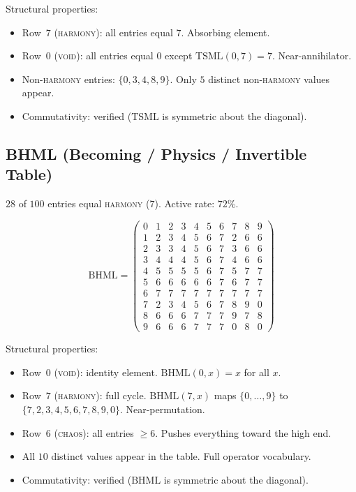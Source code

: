 \documentclass[11pt,a4paper]{article}
\theoremstyle{definition}
\theoremstyle{remark}
\newcommand{\TSML}{\mathrm{TSML}}
\newcommand{\BHML}{\mathrm{BHML}}
\begin{document}
Structural properties:
\begin{itemize}
\item Row~$7$ (\textsc{harmony}): all entries equal $7$. Absorbing element.
\item Row~$0$ (\textsc{void}): all entries equal $0$ except $\TSML(0,7)=7$. Near-annihilator.
\item Non-\textsc{harmony} entries: $\{0,3,4,8,9\}$. Only $5$ distinct non-\textsc{harmony} values appear.
\item Commutativity: verified ($\TSML$ is symmetric about the diagonal).
\end{itemize}

\subsection{BHML (Becoming / Physics / Invertible Table)}\label{app:bhml}

$28$ of $100$ entries equal \textsc{harmony} ($7$). Active rate: $72\%$.

\[
\BHML = \begin{pmatrix}
0 & 1 & 2 & 3 & 4 & 5 & 6 & 7 & 8 & 9\\
1 & 2 & 3 & 4 & 5 & 6 & 7 & 2 & 6 & 6\\
2 & 3 & 3 & 4 & 5 & 6 & 7 & 3 & 6 & 6\\
3 & 4 & 4 & 4 & 5 & 6 & 7 & 4 & 6 & 6\\
4 & 5 & 5 & 5 & 5 & 6 & 7 & 5 & 7 & 7\\
5 & 6 & 6 & 6 & 6 & 6 & 7 & 6 & 7 & 7\\
6 & 7 & 7 & 7 & 7 & 7 & 7 & 7 & 7 & 7\\
7 & 2 & 3 & 4 & 5 & 6 & 7 & 8 & 9 & 0\\
8 & 6 & 6 & 6 & 7 & 7 & 7 & 9 & 7 & 8\\
9 & 6 & 6 & 6 & 7 & 7 & 7 & 0 & 8 & 0
\end{pmatrix}
\]

Structural properties:
\begin{itemize}
\item Row~$0$ (\textsc{void}): identity element. $\BHML(0,x)=x$ for all $x$.
\item Row~$7$ (\textsc{harmony}): full cycle. $\BHML(7,x)$ maps $\{0,\ldots,9\}$ to $\{7,2,3,4,5,6,7,8,9,0\}$. Near-permutation.
\item Row~$6$ (\textsc{chaos}): all entries $\geq 6$. Pushes everything toward the high end.
\item All $10$ distinct values appear in the table. Full operator vocabulary.
\item Commutativity: verified ($\BHML$ is symmetric about the diagonal).
\end{itemize}
\end{document}
